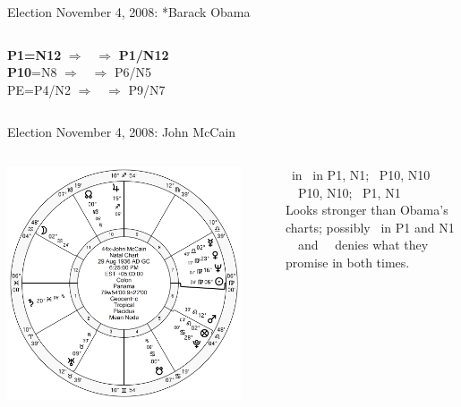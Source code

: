 \begin{frame}[t]{Election November 4, 2008: *Barack Obama}
\begin{columns}[T, onlytextwidth]
\textbf{\dgreen P1=N12}
	$\Rightarrow$ \Saturn\, $\Rightarrow$ \textbf{\dgreen P1/N12}\\
\textbf{\red P10}=N8
	$\Rightarrow$ \Venus\, $\Rightarrow$ P6/N5\\
PE=P4/N2
	 $\Rightarrow$ \Mars\, $\Rightarrow$ P9/N7

\end{columns}
\end{frame}

\begin{frame}[t]{Election November 4, 2008: John McCain}
\small
\begin{columns}[T, onlytextwidth]
\vspace{-1em}
{\includegraphics[width=0.9\textwidth]{charts/McCain.png}}
\fontsize{7pt}{8pt}\selectfont

\Jupiter\, in \Sagittarius\, in P1, N1; \Square\, P10, N10 \\
\Venus\, \Square\, P10, N10; \Opposition\, P1, N1 \\
\vspace{0.5em}
Looks stronger than Obama's charts; possibly \Saturn\, in P1 and N1 \Square\, \Jupiter\, and \Opposition\, \Venus\, denies what they promise in both times.


\end{columns}
\end{frame}
